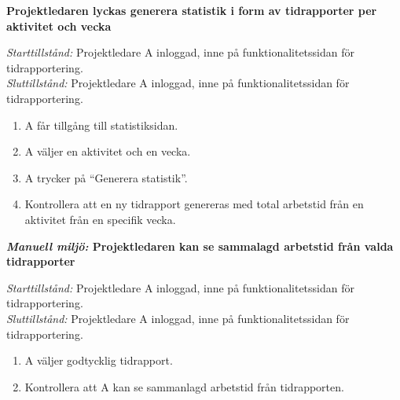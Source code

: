 \documentclass[a4paper]{article}
\def\reqinside{\hfil\penalty 100 \hfilneg \hbox}
\def \req [#1]{\reqinside{[SRS krav #1]}}
\begin{document}
\begin{FT}
\item
\textbf{Projektledaren lyckas generera statistik i form av tidrapporter per aktivitet och vecka}

\emph{Starttillstånd:} Projektledare A inloggad, inne på funktionalitetssidan för tidrapportering.\\
\emph{Sluttillstånd:} Projektledare A inloggad, inne på funktionalitetssidan för tidrapportering.

\begin{enumerate}
\item A får tillgång till statistiksidan.
\item A väljer en aktivitet och en vecka.
\item A trycker på ``Generera statistik''.
\item Kontrollera att en ny tidrapport genereras med total arbetstid från en aktivitet från en specifik vecka.
\end{enumerate}


\item
\textbf{\emph{Manuell miljö:} Projektledaren kan se sammalagd arbetstid från valda tidrapporter}

\emph{Starttillstånd:} Projektledare A inloggad, inne på funktionalitetssidan för tidrapportering.\\
\emph{Sluttillstånd:} Projektledare A inloggad, inne på funktionalitetssidan för tidrapportering.

\begin{enumerate}
\item A väljer godtycklig tidrapport.
\item Kontrollera att A kan se sammanlagd arbetstid från tidrapporten.
\end{enumerate}





\end{FT}
\end{document}
